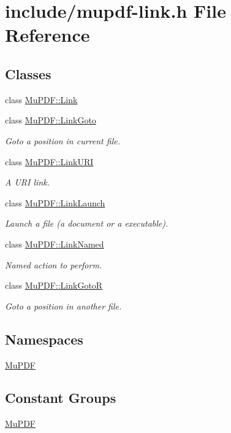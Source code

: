 \hypertarget{mupdf-link_8h}{\section{include/mupdf-\/link.h File Reference}
\label{mupdf-link_8h}
}
\subsection*{Classes}
\begin{DoxyCompactItemize}
\item 
class \hyperlink{class_mu_p_d_f_1_1_link}{Mu\-P\-D\-F\-::\-Link}
\item 
class \hyperlink{class_mu_p_d_f_1_1_link_goto}{Mu\-P\-D\-F\-::\-Link\-Goto}
\begin{DoxyCompactList}\small\item\em Goto a position in current file. \end{DoxyCompactList}\item 
class \hyperlink{class_mu_p_d_f_1_1_link_u_r_i}{Mu\-P\-D\-F\-::\-Link\-U\-R\-I}
\begin{DoxyCompactList}\small\item\em A U\-R\-I link. \end{DoxyCompactList}\item 
class \hyperlink{class_mu_p_d_f_1_1_link_launch}{Mu\-P\-D\-F\-::\-Link\-Launch}
\begin{DoxyCompactList}\small\item\em Launch a file (a document or a executable). \end{DoxyCompactList}\item 
class \hyperlink{class_mu_p_d_f_1_1_link_named}{Mu\-P\-D\-F\-::\-Link\-Named}
\begin{DoxyCompactList}\small\item\em Named action to perform. \end{DoxyCompactList}\item 
class \hyperlink{class_mu_p_d_f_1_1_link_goto_r}{Mu\-P\-D\-F\-::\-Link\-Goto\-R}
\begin{DoxyCompactList}\small\item\em Goto a position in another file. \end{DoxyCompactList}\end{DoxyCompactItemize}
\subsection*{Namespaces}
\begin{DoxyCompactItemize}
\item 
\hyperlink{namespace_mu_p_d_f}{Mu\-P\-D\-F}
\end{DoxyCompactItemize}
\subsection*{Constant Groups}
\begin{DoxyCompactItemize}
\item 
\hyperlink{namespace_mu_p_d_f}{Mu\-P\-D\-F}
\end{DoxyCompactItemize}
